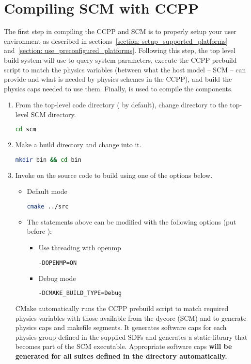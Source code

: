 \section{Compiling SCM with CCPP}
\label{section: compiling}
The first step in compiling the CCPP and SCM is to properly setup your user environment as described in sections~\ref{section: setup_supported_platforms} and~\ref{section: use_preconfigured_platforms}. Following this step, the top level build system will use  to query system parameters, execute the CCPP prebuild script to match the physics variables (between what the host model -- SCM -- can provide and what is needed by physics schemes in the CCPP), and build the physics caps needed to use them. Finally,  is used to compile the components.
\begin{enumerate}
 \item From the top-level code directory ( by default), change directory to the top-level SCM directory.
\begin{lstlisting}[language=bash]
cd scm
\end{lstlisting}
\item Make a build directory and change into it.
\begin{lstlisting}[language=bash]
mkdir bin && cd bin
\end{lstlisting}
\item Invoke  on the source code to build using one of the options below.
\begin{itemize}
\item Default mode
\begin{lstlisting}[language=bash]
cmake ../src
\end{lstlisting}
\item The statements above can be modified with the following options (put before ):
\begin{itemize}
\item Use threading with openmp
\begin{lstlisting}[language=bash]
-DOPENMP=ON
\end{lstlisting}
\item Debug mode
\begin{lstlisting}[language=bash]
-DCMAKE_BUILD_TYPE=Debug
\end{lstlisting}
\end{itemize}
\end{itemize}

CMake automatically runs the CCPP prebuild script to match required physics variables with those available from the dycore (SCM) and to generate physics caps and makefile segments. It generates software caps for each physics group defined in the supplied SDFs and generates a static library that becomes part of the SCM executable. Appropriate software caps \textbf{will be generated for all suites defined in the  directory automatically.}


\end{enumerate}
